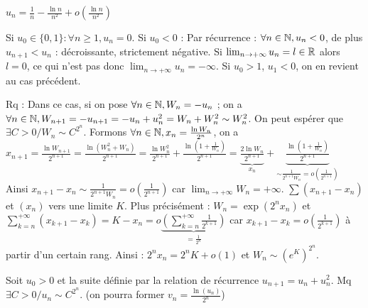 \begin{solution}
$\boxed{u_n = \frac{1}{n} - \frac{\ln n}{n^2} + o\left(\frac{\ln n}{n^2}\right)}$

Si $u_0 \in \{0, 1\} : \forall n \geq 1, u_n = 0$.
Si $u_0 < 0$ : Par récurrence : $\forall n \in \mathbb N, u_n < 0$, de plus $u_{n+1} < u_n$ : décroissante, strictement négative.
Si $\lim_{n \to +\infty} u_n = l \in \mathbb R$ alors $l = 0$, ce qui n'est pas donc $\boxed{\lim_{n \to +\infty} u_n = -\infty}$.
Si $u_0 > 1$, $u_1 < 0$, on en revient au cas précédent.

Rq : Dans ce cas, si on pose $\forall n \in \mathbb N, W_n = -u_n$ ; on a $\forall n \in \mathbb N, W_{n+1} = -u_{n+1} = -u_n + u_n^2 = W_n + W_n^2 \sim W_n^2$.
On peut espérer que $\exists C > 0 / W_n \sim C^{2^n}$.
Formons $\forall n \in \mathbb N, x_n = \frac{\ln W_n}{2^n}$, on a $x_{n+1} = \frac{\ln W_{n+1}}{2^{n+1}} = \frac{\ln(W_n^2 + W_n)}{2^{n+1}} = \frac{\ln W_n^2}{2^{n+1}} + \frac{\ln\left(1 + \frac{1}{W_n}\right)}{2^{n+1}} = \underbrace{\frac{2\ln W_n}{2^{n+1}}}_{x_n} + \underbrace{\frac{\ln\left(1 + \frac{1}{W_n}\right)}{2^{n+1}}}_{\sim \frac{1}{2^{n+1} W_n} = o\left(\frac{1}{2^{n+1}}\right)}$
Ainsi $x_{n+1} - x_n \sim \frac{1}{2^{n+1} W_n} = o\left(\frac{1}{2^{n+1}}\right)$ car $\lim_{n \to +\infty} W_n = +\infty$.
$\sum (x_{n+1} - x_n)$  et $(x_n)$  vers une limite $K$.
Plus précisément : $W_n = \exp(2^n x_n)$ et $\sum_{k=n}^{+\infty} (x_{k+1} - x_k) = K - x_n = o\underbrace{\left(\sum_{k=n}^{+\infty} \frac{1}{2^{k+1}}\right)}_{= \frac{1}{2^n}}$ car $x_{k+1} - x_k = o\left(\frac{1}{2^{k+1}}\right)$ à partir d'un certain rang.
Ainsi : $2^n x_n = 2^n K + o(1)$ et $\boxed{W_n \sim (e^K)^{2^n}}$.
\end{solution}


\begin{statementbox}
Soit $u_0 > 0$ et la suite définie par la relation de récurrence $u_{n+1} = u_n + u_n^2$. Mq $\exists C > 0 / u_n \sim C^{2^n}$.
(on pourra former $v_n = \frac{\ln(u_n)}{2^n}$)
\end{statementbox}

